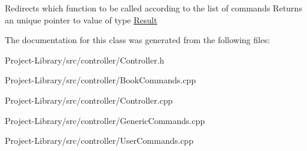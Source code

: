 Redirects which function to be called according to the list of commands Returns an unique pointer to value of type \hyperlink{classResult}{Result} 

The documentation for this class was generated from the following files\+:\begin{DoxyCompactItemize}
\item 
Project-\/\+Library/src/controller/Controller.\+h\item 
Project-\/\+Library/src/controller/Book\+Commands.\+cpp\item 
Project-\/\+Library/src/controller/Controller.\+cpp\item 
Project-\/\+Library/src/controller/Generic\+Commands.\+cpp\item 
Project-\/\+Library/src/controller/User\+Commands.\+cpp\end{DoxyCompactItemize}
